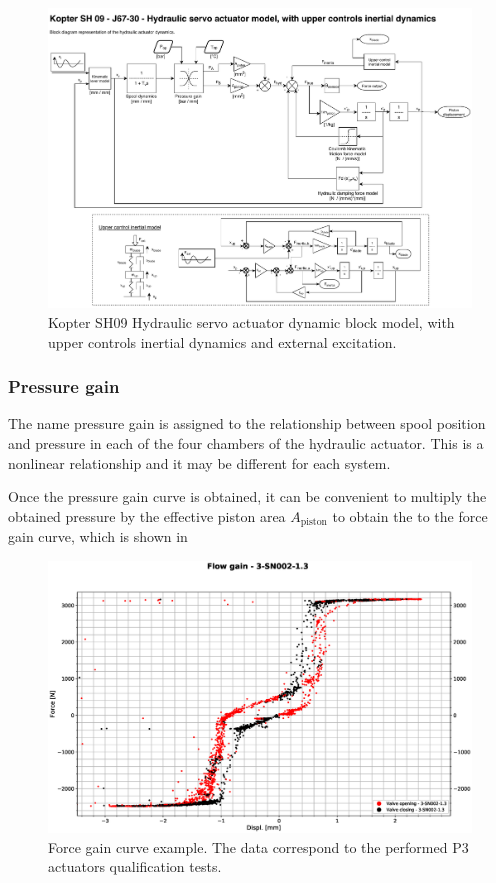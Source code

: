  \begin{figure}[!htpb]
    \centering
    \includegraphics[width=0.9 \textwidth]{figures/modelActuator}
    \caption[Dynamic block model of the hydraulic actuator]{Kopter SH09 Hydraulic servo actuator dynamic block model, with upper controls inertial dynamics and external excitation.}
    \label{fig:modelActuator}
  \end{figure}

  \subsubsection{Pressure gain}

    The name pressure gain is assigned to the relationship between spool position and pressure in each of the four chambers of the hydraulic actuator. This is a nonlinear relationship and it may be different for each system.

    Once the pressure gain curve is obtained, it can be convenient to multiply the obtained pressure by the effective piston area $A_{\mathrm{piston}}$ to obtain the to the force gain curve, which is shown in 

    \begin{figure}[!htpb]
      \centering
      \includegraphics[width=0.9 \textwidth]{figures/flow_gain_example}
      \caption[Force gain curve example]{Force gain curve example. The data correspond to the performed P3 actuators qualification tests.}
      \label{fig:flow_gain_example}
    \end{figure}

